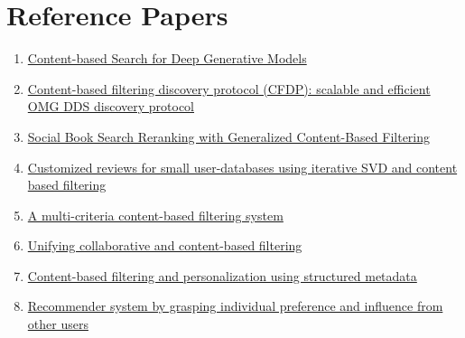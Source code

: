 \section*{Reference Papers}\label{sec:reference_papers}


\begin{enumerate}[noitemsep, topsep=1px]
    \item \href{https://dl.acm.org/doi/10.1145/3610548.3618189}{Content-based Search for Deep Generative Models} 
    \item \href{https://dl.acm.org/doi/10.1145/2611286.2611300}{Content-based filtering discovery protocol (CFDP): scalable and efficient OMG DDS discovery protocol}
    \item \href{https://dl.acm.org/doi/10.1145/2661829.2661940}{Social Book Search Reranking with Generalized Content-Based Filtering}
    \item \href{https://dl.acm.org/doi/10.1145/2501025.2501036}{Customized reviews for small user-databases using iterative SVD and content based filtering}
    \item \href{https://dl.acm.org/doi/10.1145/1277741.1277903}{A multi-criteria content-based filtering system}
    \item \href{https://dl.acm.org/doi/10.1145/1015330.1015394}{Unifying collaborative and content-based filtering}
    \item \href{https://dl.acm.org/doi/10.1145/544220.544341}{Content-based filtering and personalization using structured metadata}
    \item \href{https://dl.acm.org/doi/10.1145/2492517.2500283}{Recommender system by grasping individual preference and influence from other users}
\end{enumerate}

